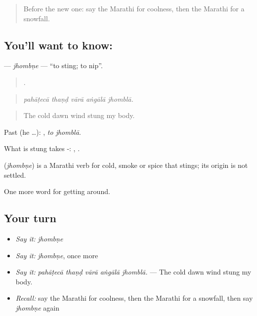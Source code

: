 \label{lesson:MR-C437-jhombne}



\begin{quote}
Before the new one: say the Marathi for coolness, then the Marathi for a snowfall.
\end{quote}

\subsection*{You'll want to know: }
\textbf{} — \emph{jhombṇe} — \textquotedblleft{}to sting; to nip\textquotedblright{}.

\begin{quote}
    .
\end{quote}

\begin{quote}
\emph{pahāṭecā thaṇḍ vārā aṅgālā jhomblā.}
\end{quote}

\begin{quote}
The cold dawn wind stung my body.
\end{quote}

Past (he …):  , \emph{to jhomblā}.

What is stung takes -: ,  .

\begin{cousinweb}
\textbf{} (\emph{jhombṇe}) is a Marathi verb for cold, smoke or spice that stings; its origin is not settled.
\end{cousinweb}

\begin{grammarlens}[title={What you've built}]
One more word for getting around.
\end{grammarlens}

\subsection*{Your turn}
\begin{itemize}
\raggedright
  \item \emph{Say it:} \emph{jhombṇe}
  \item \emph{Say it:} \emph{jhombṇe}, once more
  \item \emph{Say it:} \emph{pahāṭecā thaṇḍ vārā aṅgālā jhomblā.} — The cold dawn wind stung my body.
  \item \emph{Recall:} say the Marathi for coolness, then the Marathi for a snowfall, then say \emph{jhombṇe} again
\end{itemize}

